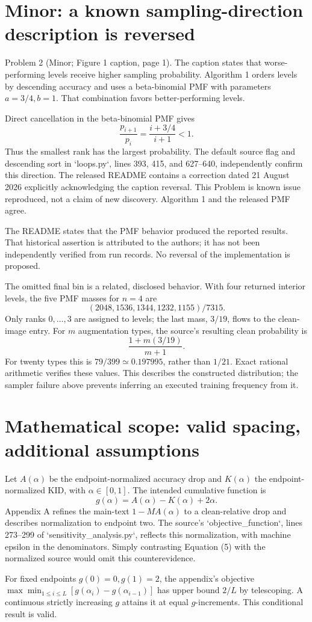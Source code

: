 \documentclass[10pt]{article}
\begin{document}
\section*{Minor: a known sampling-direction description is reversed}
Problem 2 (Minor; Figure 1 caption, page 1).  The caption states that worse-performing levels receive higher sampling probability. Algorithm 1 orders levels by descending accuracy and uses a beta-binomial PMF with parameters \(a=3/4,b=1\). That combination favors better-performing levels.\par
Direct cancellation in the beta-binomial PMF gives \[\frac{p_{i+1}}{p_i}=\frac{i+3/4}{i+1}<1.\] Thus the smallest rank has the largest probability. The default source flag and descending sort in `loops.py`, lines 393, 415, and 627–640, independently confirm this direction. The released README contains a correction dated 21 August 2026 explicitly acknowledging the caption reversal. This Problem is known issue reproduced, not a claim of new discovery. Algorithm 1 and the released PMF agree.\par
The README states that the PMF behavior produced the reported results. That historical assertion is attributed to the authors; it has not been independently verified from run records. No reversal of the implementation is proposed.\par
The omitted final bin is a related, disclosed behavior. With four returned interior levels, the five PMF masses for \(n=4\) are \[(2048,1536,1344,1232,1155)/7315.\] Only ranks \(0,\ldots,3\) are assigned to levels; the last mass, \(3/19\), flows to the clean-image entry. For \(m\) augmentation types, the source’s resulting clean probability is \[\frac{1+m(3/19)}{m+1}.\] For twenty types this is \(79/399\simeq0.197995\), rather than \(1/21\). Exact rational arithmetic verifies these values. This describes the constructed distribution; the sampler failure above prevents inferring an executed training frequency from it.\par
\section*{Mathematical scope: valid spacing, additional assumptions}
Let \(A(\alpha)\) be the endpoint-normalized accuracy drop and \(K(\alpha)\) the endpoint-normalized KID, with \(\alpha\in[0,1]\). The intended cumulative function is \[g(\alpha)=A(\alpha)-K(\alpha)+2\alpha.\] Appendix A refines the main-text \(1-MA(\alpha)\) to a clean-relative drop and describes normalization to endpoint two. The source’s `objective\_function`, lines 273–299 of `sensitivity\_analysis.py`, reflects this normalization, with machine epsilon in the denominators. Simply contrasting Equation (5) with the normalized source would omit this counterevidence.\par
For fixed endpoints \(g(0)=0,g(1)=2\), the appendix’s objective \(\max\min_{1\le i\le L}[g(\alpha_i)-g(\alpha_{i-1})]\) has upper bound \(2/L\) by telescoping. A continuous strictly increasing \(g\) attains it at equal \(g\)-increments. This conditional result is valid.\par
\end{document}
